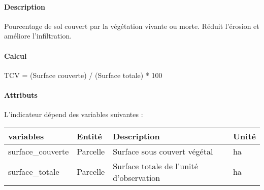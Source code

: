 \documentclass[
]{article}
\newenvironment{Shaded}{\begin{snugshade}}{\end{snugshade}}
\newcommand{\NormalTok}[1]{#1}
\begin{document}
\paragraph{Description}\label{description-9}

Pourcentage de sol couvert par la végétation vivante ou morte. Réduit
l'érosion et améliore l'infiltration.

\paragraph{Calcul}\label{calcul-9}

\begin{Shaded}
\begin{Highlighting}[]
\NormalTok{TCV = (Surface couverte) / (Surface totale) * 100}
\end{Highlighting}
\end{Shaded}

\paragraph{Attributs}\label{attributs-27}

L'indicateur dépend des variables suivantes :

\begin{longtable}[]{@{}
  >{\raggedright\arraybackslash}p{}
  >{\raggedright\arraybackslash}p{}
  >{\raggedright\arraybackslash}p{}
  >{\raggedright\arraybackslash}p{}@{}}
\toprule\noalign{}
\begin{minipage}[b]{\linewidth}\raggedright
\textbf{variables}
\end{minipage} & \begin{minipage}[b]{\linewidth}\raggedright
\textbf{Entité}
\end{minipage} & \begin{minipage}[b]{\linewidth}\raggedright
\textbf{Description}
\end{minipage} & \begin{minipage}[b]{\linewidth}\raggedright
\textbf{Unité}
\end{minipage} \\
\midrule\noalign{}
\endhead
\bottomrule\noalign{}
\endlastfoot
surface\_couverte & Parcelle & Surface sous couvert végétal & ha \\
surface\_totale & Parcelle & Surface totale de l'unité d'observation &
ha \\
\end{longtable}
\end{document}
